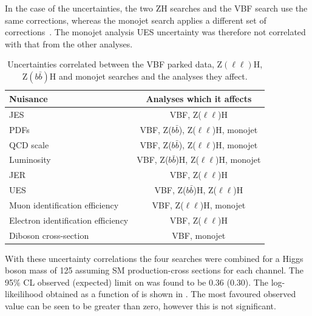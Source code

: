 In the case of the \MET uncertainties, the two ZH searches and the \ac{VBF} search use the same \MET corrections, whereas the monojet search applies a different set of corrections~\cite{CMS-PAS-EXO-12-055}. The monojet analysis \ac{UES} uncertainty was therefore not correlated with that from the other analyses.

\begin{table}
  \caption{Uncertainties correlated between the \ac{VBF} parked data, Z$(\ell\ell)$H, Z$(b\bar{b})$H and monojet searches and the analyses they affect.}%
  \label{tab:parkedcorrs}
  \begin{tabular}{|l|c|}
      \hline
      Nuisance & Analyses which it affects \\
      \hline
      \ac{JES} & VBF, Z($\ell\ell$)H \\
      PDFs & VBF, Z($b\bar{b}$), Z($\ell\ell$)H, monojet \\
      QCD scale & VBF, Z($b\bar{b}$), Z($\ell\ell$)H, monojet \\
      Luminosity & VBF, Z($b\bar{b}$)H, Z($\ell\ell$)H, monojet \\
      \ac{JER} & VBF, Z($\ell\ell$)H \\
      \ac{UES} & VBF, Z($b\bar{b}$)H, Z($\ell\ell$)H \\
      Muon identification efficiency & VBF, Z($\ell\ell$)H, monojet \\
      Electron identification efficiency & VBF, Z($\ell\ell$)H \\
      Diboson cross-section & VBF, monojet \\
      \hline
    \end{tabular}
\end{table}

With these uncertainty correlations the four searches were combined for a Higgs boson mass of 125 \GeV assuming \ac{SM} production-cross sections for each channel. The 95\% \ac{CL} observed (expected) limit on \BRinv was found to be 0.36 (0.30). The log-likeilihood obtained as a function of \BRinv is shown in . The most favoured observed value can be seen to be greater than zero, however this is not significant.

